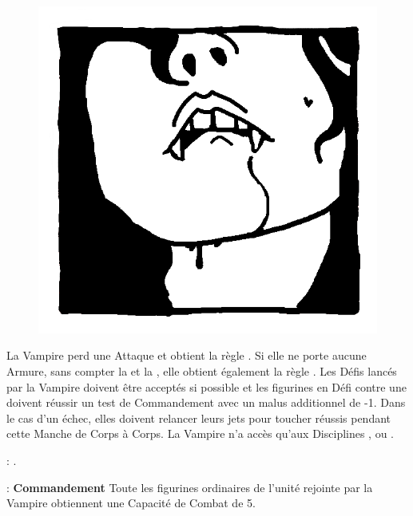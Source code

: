 \newpage
{}

\begin{figure}
\centering
\includegraphics[width=\logosize]{pics/logo_lamia.png}
\end{figure}
La Vampire perd une Attaque et obtient la règle \lightningreflexes{}. Si elle ne porte aucune Armure, sans compter la \mountsprotection{} et la \innatedefence{}, elle obtient également la règle \distracting{}. Les Défis lancés par la Vampire doivent être acceptés si possible et les figurines en Défi contre une \lamia{} doivent réussir un test de Commandement avec un malus additionnel de -1. Dans le cas d'un échec, elles doivent relancer leurs jets pour toucher réussis pendant cette Manche de Corps à Corps. La Vampire n'a accès qu'aux Disciplines \light{}, \shadows{} ou \necromancy{}.

\vspace{0.5cm}
\bloodties{} : \textbf{\courtofthedamned{}}.

\vspace{0.5cm}
\ancientbloodpower{} : \textbf{Commandement}\dotfill{}\newline%
Toute les figurines ordinaires de l'unité rejointe par la Vampire obtiennent une Capacité de Combat de 5.


